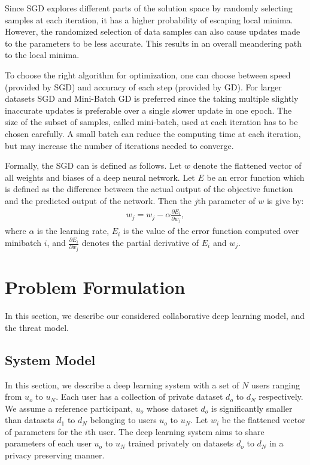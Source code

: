 \documentclass[conference]{IEEEtran}
\begin{document}
Since SGD explores different parts of the solution space by randomly selecting samples at each iteration, it has a higher probability of escaping local minima. However, the randomized selection of data samples can also cause updates made to the parameters to be less accurate. This results in an overall meandering path to the local minima. 

To choose the right algorithm for optimization, one can choose between speed (provided by SGD) and accuracy of each step (provided by GD). For larger datasets SGD and Mini-Batch GD is preferred since the taking multiple slightly inaccurate updates is preferable over a single slower update in one epoch.
The size of the subset of samples, called mini-batch, used at each iteration has to be chosen carefully. A small batch can reduce the
computing time at each iteration, but may increase the number of iterations needed to converge. 


Formally, the SGD can is defined as follows. 
Let $w$ denote the flattened
vector of all weights and biases of a deep neural
network. Let $E$ be an error function which is defined as the difference between the actual output of the objective function and the
predicted output of the network. 
Then the $j$th parameter of $w$ is give by:
\begin{align}\label{eq:SGD}
w_j = w_j -\alpha \frac{\partial E_i}{\partial w_j}, 
\end{align}
where $\alpha$ is the learning rate,  $E_i$ is the value of the error function computed over minibatch $i$, and  
$\frac{\partial E_i}{\partial w_j}$ denotes the partial derivative of $E_i$ and $w_j$. 
 

\section{Problem Formulation}
In this section, we describe our considered collaborative deep learning model, and the threat model. 

\subsection{System Model} \label{sec:systemModel}
In this section, we describe a deep learning system with a set of $N$ users ranging from  $u_o$ to $u_N$. Each user has a collection of private dataset $d_o$ to $d_N$ respectively. We assume a reference  participant, $u_o$ whose dataset $d_o$ is significantly smaller than datasets $d_1$ to $d_N$ belonging to users $u_o$ to $u_N$. Let $w_i$ be the flattened vector of parameters for the $i$th user.
The deep learning system aims to share parameters of each user $u_o$ to $u_N$  trained privately on datasets $d_o$ to $d_N$ in a privacy preserving manner.
\end{document}
